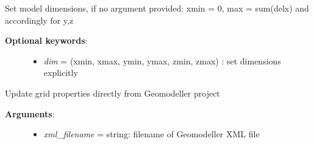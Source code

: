 \documentclass[letterpaper,10pt,english]{sphinxmanual}
\begin{document}
\begin{fulllineitems}
\begin{fulllineitems}
\begin{description}
\begin{itemize}
\end{itemize}

\end{description}

\end{fulllineitems}


\begin{fulllineitems}
\label{pygeomod:pygeomod.geogrid.GeoGrid.set_dimensions}
Set model dimensions, if no argument provided: xmin = 0, max = sum(delx) and accordingly for y,z
\begin{description}
\item[{\textbf{Optional keywords}:}] \leavevmode\begin{itemize}
\item {} 
\emph{dim} = (xmin, xmax, ymin, ymax, zmin, zmax) : set dimensions explicitly

\end{itemize}

\end{description}

\end{fulllineitems}


\begin{fulllineitems}
\label{pygeomod:pygeomod.geogrid.GeoGrid.update_from_geomodeller_project}
Update grid properties directly from Geomodeller project
\begin{description}
\item[{\textbf{Arguments}:}] \leavevmode\begin{itemize}
\item {} 
\emph{xml\_filename} = string: filename of Geomodeller XML file

\end{itemize}

\end{description}

\end{fulllineitems}


\end{fulllineitems}

\end{document}
